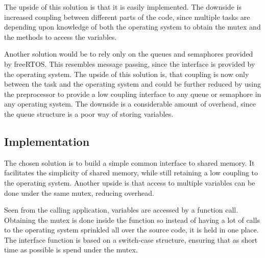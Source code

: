 The upside of this solution is that it is easily implemented. The downside is
increased coupling between different parts of the code, since multiple tasks are
depending upon knowledge of both the operating system to obtain the mutex and
the methods to access the variables.

Another solution would be to rely only on the queues and semaphores provided by
freeRTOS. This resembles message passing, since the interface is provided by the
operating system. The upside of this solution is, that coupling is now only
between the task and the operating system and could be further reduced by using
the preprocessor to provide a low coupling interface to any queue or semaphore
in any operating system. The downside is a considerable amount of overhead,
since the queue structure is a poor way of storing variables.

\subsection{Implementation}
The chosen solution is to build a simple common interface to shared memory. It
facilitates the simplicity of shared memory, while still retaining a low
coupling to the operating system. Another upside is that access to multiple
variables can be done under the same mutex, reducing overhead.

Seen from the calling application, variables are accessed by a function call.
Obtaining the mutex is done inside the function so instead of having a lot of
calls to the operating system sprinkled all over the source code, it is held in
one place. The interface function is based on a switch-case structure, ensuring
that as short time as possible is spend under the mutex.



